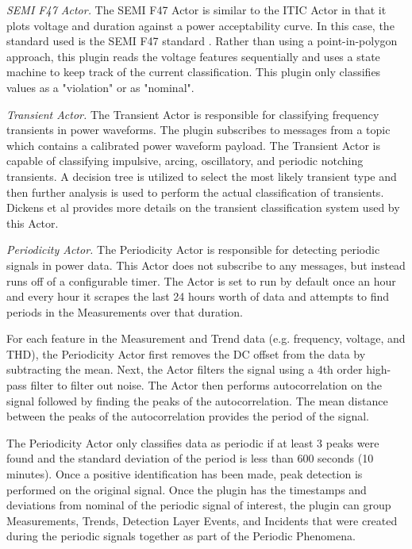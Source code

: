 {\em SEMI F47 Actor.} The SEMI F47 Actor is similar to the ITIC Actor in that it plots voltage and duration against a power acceptability curve. In this case, the standard used is the SEMI F47 standard \cite{djokic_sensitivity_2005}. Rather than using a point-in-polygon approach, this plugin reads the voltage features sequentially and uses a state machine to keep track of the current classification. This plugin only classifies values as a "violation" or as "nominal".

{\em Transient Actor.} The Transient Actor is responsible for classifying frequency transients in power waveforms. The plugin subscribes to messages from a topic which contains a calibrated power waveform payload. The Transient Actor is capable of classifying impulsive, arcing, oscillatory, and periodic notching transients. A decision tree is utilized to select the most likely transient type and then further analysis is used to perform the actual classification of transients. Dickens et al \cite{dickens_transient_2019} provides more details on the transient classification system used by this Actor.

{\em Periodicity Actor.} The Periodicity Actor is responsible for detecting periodic signals in power data. This Actor does not subscribe to any messages, but instead runs off of a configurable timer. The Actor is set to run by default once an hour and every hour it scrapes the last 24 hours worth of data and attempts to find periods in the Measurements over that duration.

For each feature in the Measurement and Trend data (e.g. frequency, voltage, and THD), the Periodicity Actor first removes the DC offset from the data by subtracting the mean. Next, the Actor filters the signal using a 4th order high-pass filter to filter out noise. The Actor then performs autocorrelation on the signal followed by finding the peaks of the autocorrelation. The mean distance between the peaks of the autocorrelation provides the period of the signal.

The Periodicity Actor only classifies data as periodic if at least 3 peaks were found and the standard deviation of the period is less than 600 seconds (10 minutes). Once a positive identification has been made, peak detection is performed on the original signal. Once the plugin has the timestamps and deviations from nominal of the periodic signal of interest, the plugin can group Measurements, Trends, Detection Layer Events, and Incidents that were created during the periodic signals together as part of the Periodic Phenomena.



